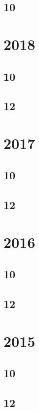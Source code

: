 \documentclass[11pt]{book}
\begin{document}
\subsection{10}

\section{2018}
\subsection{10}


\subsection{12}




\section{2017}
\subsection{10}

\subsection{12}



\section{2016}
\subsection{10}

\subsection{12}



\section{2015}
\subsection{10}

\subsection{12}

\end{document}
